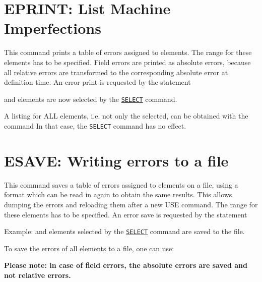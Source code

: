 \section{EPRINT: List Machine Imperfections}  
\label{sec:eprint}
This command prints a table of errors assigned to elements. The range
for these elements has to be specified. Field errors are printed as
absolute errors, because all relative errors are transformed to the
corresponding absolute error at definition time. An error print is
requested by the statement  

and elements are now selected by the
\hyperref[sec:select]{\tt SELECT} command.  

A listing for ALL elements, i.e. not only the selected, can be obtained
with the command  
In that case, the {\tt SELECT} command has no effect.


%

\section{ESAVE: Writing errors to a file}
\label{sec:esave}


This command saves a table of errors assigned to elements on a file,
using a format which can be read in again to obtain the same
results. This allows dumping the errors and reloading them after a new
USE command. The range for these elements has to be specified. An error
save is requested by the statement  

Example: 
and elements selected by the  \hyperref[sec:select]{\tt SELECT}
command are saved to the file.  


To save the errors of all elements to a file, one can use: 

{\bf Please note: in case of field errors, the absolute errors are
  saved and not relative errors. } 

